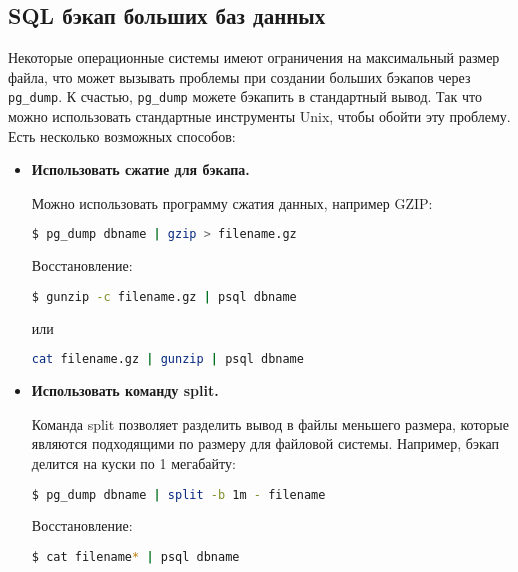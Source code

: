 \subsection{SQL бэкап больших баз данных}

Некоторые операционные системы имеют ограничения на максимальный размер файла, что может вызывать проблемы при создании больших бэкапов через \lstinline!pg_dump!. К счастью, \lstinline!pg_dump! можете бэкапить в стандартный вывод. Так что можно использовать стандартные инструменты Unix, чтобы обойти эту проблему. Есть несколько возможных способов:

\begin{itemize}
  \item \textbf{Использовать сжатие для бэкапа.}

Можно использовать программу сжатия данных, например GZIP:

\begin{lstlisting}[language=Bash,label=lst:backups7,caption=Сжатие бэкапа PostgreSQL]
$ pg_dump dbname | gzip > filename.gz
\end{lstlisting}

Восстановление:

\begin{lstlisting}[language=Bash,label=lst:backups8,caption=Восстановление бэкапа PostgreSQL]
$ gunzip -c filename.gz | psql dbname
\end{lstlisting}

или

\begin{lstlisting}[language=Bash,label=lst:backups9,caption=Восстановление бэкапа PostgreSQL]
cat filename.gz | gunzip | psql dbname
\end{lstlisting}

\item \textbf{Использовать команду split.}

Команда split позволяет разделить вывод в файлы меньшего размера, которые являются подходящими по размеру для файловой системы. Например, бэкап делится на куски по 1 мегабайту:

\begin{lstlisting}[language=Bash,label=lst:backups10,caption=Создание бэкапа PostgreSQL]
$ pg_dump dbname | split -b 1m - filename
\end{lstlisting}

Восстановление:

\begin{lstlisting}[language=Bash,label=lst:backups11,caption=Восстановление бэкапа PostgreSQL]
$ cat filename* | psql dbname
\end{lstlisting}


\end{itemize}
